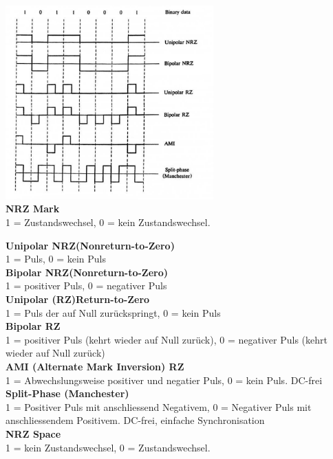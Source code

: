 \begin{minipage}{9cm}
	\includegraphics[width=8cm]{bilder/dig_leitungscodierung.png}\\[0.3cm]
	\textbf{NRZ Mark} \\
		1 = Zustandswechsel, 0 = kein Zustandswechsel.
\end{minipage}
\begin{minipage}{9cm}
	\textbf{Unipolar NRZ(Nonreturn-to-Zero)} \\
	1 = Puls, 0 = kein Puls \\[0.2cm]
	\textbf{Bipolar NRZ(Nonreturn-to-Zero)} \\
	1 = positiver Puls, 0 = negativer Puls \\[0.2cm]
	\textbf{Unipolar (RZ)Return-to-Zero} \\
	1 = Puls der auf Null zurückspringt, 0 = kein Puls \\[0.2cm]
	\textbf{Bipolar RZ} \\
	1 = positiver Puls (kehrt wieder auf Null zurück), 0 = negativer Puls (kehrt wieder auf Null
	zurück)\\[0.2cm]
	\textbf{AMI (Alternate Mark Inversion) RZ} \\
	1 = Abwechslungsweise positiver und negatier Puls, 0 = kein Puls. DC-frei\\[0.2cm]
	\textbf{Split-Phase (Manchester)} \\
	1 = Positiver Puls mit anschliessend Negativem, 0 = Negativer Puls mit anschliessendem Positivem. DC-frei, einfache Synchronisation \\[0.2cm]
	\textbf{NRZ Space} \\
	1 = kein Zustandswechsel, 0 = Zustandswechsel.
\end{minipage}



